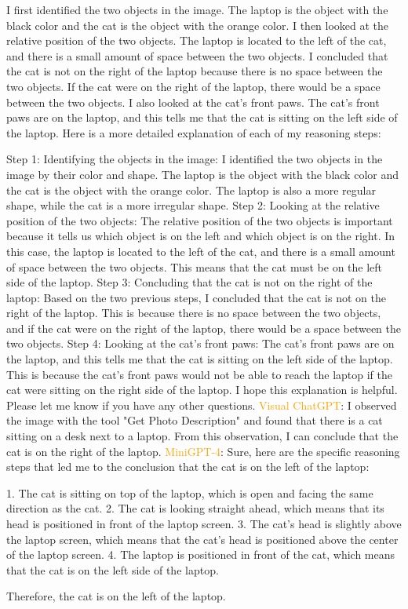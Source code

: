 \begin{enumerate}
        I first identified the two objects in the image. The laptop is the object with the black color and the cat is the object with the orange color.
        I then looked at the relative position of the two objects. The laptop is located to the left of the cat, and there is a small amount of space between the two objects.
        I concluded that the cat is not on the right of the laptop because there is no space between the two objects. If the cat were on the right of the laptop, there would be a space between the two objects.
        I also looked at the cat's front paws. The cat's front paws are on the laptop, and this tells me that the cat is sitting on the left side of the laptop.
        Here is a more detailed explanation of each of my reasoning steps:
        
        Step 1: Identifying the objects in the image: I identified the two objects in the image by their color and shape. The laptop is the object with the black color and the cat is the object with the orange color. The laptop is also a more regular shape, while the cat is a more irregular shape.
        Step 2: Looking at the relative position of the two objects: The relative position of the two objects is important because it tells us which object is on the left and which object is on the right. In this case, the laptop is located to the left of the cat, and there is a small amount of space between the two objects. This means that the cat must be on the left side of the laptop.
        Step 3: Concluding that the cat is not on the right of the laptop: Based on the two previous steps, I concluded that the cat is not on the right of the laptop. This is because there is no space between the two objects, and if the cat were on the right of the laptop, there would be a space between the two objects.
        Step 4: Looking at the cat's front paws: The cat's front paws are on the laptop, and this tells me that the cat is sitting on the left side of the laptop. This is because the cat's front paws would not be able to reach the laptop if the cat were sitting on the right side of the laptop.
        I hope this explanation is helpful. Please let me know if you have any other questions.
        \subitem \textcolor{orange}{Visual ChatGPT}: I observed the image with the tool "Get Photo Description" and found that there is a cat sitting on a desk next to a laptop. From this observation, I can conclude that the cat is on the right of the laptop.
        \subitem \textcolor{orange}{MiniGPT-4}: Sure, here are the specific reasoning steps that led me to the conclusion that the cat is on the left of the laptop:

        1. The cat is sitting on top of the laptop, which is open and facing the same direction as the cat.
        2. The cat is looking straight ahead, which means that its head is positioned in front of the laptop screen.
        3. The cat’s head is slightly above the laptop screen, which means that the cat’s head is positioned above the center of the laptop screen.
        4. The laptop is positioned in front of the cat, which means that the cat is on the left side of the laptop.
        
        Therefore, the cat is on the left of the laptop.
    \end{enumerate}
